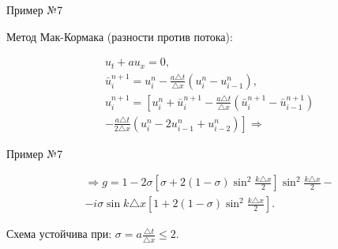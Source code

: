 \documentclass[12pt,xcolor=pst,aspectratio=169]{beamer}
\begin{document}
\begin{frame}{Пример №7}

	\transdissolve[duration=0.1]
	\justifying
	\large

	Метод Мак-Кормака (разности против потока):

	\[
		\begin{split}
			&u_{t} + a u_{x} = 0 , \\
			&\bar{u}^{n + 1}_{i} = u^{n}_{i} - \frac{a \triangle t}{\triangle x} (u^{n}_{i} - u^{n}_{i - 1}) , \\
			&u^{n + 1}_{i} = \left[ u^{n}_{i} + \bar{u}^{n + 1}_{i} - \frac{a \triangle t}{\triangle x} (\bar{u}^{n + 1}_{i} - \bar{u}^{n + 1}_{i - 1}) \right. \\
			& \left. - \frac{a \triangle t}{2 \triangle x} (u^{n}_{i} - 2 u^{n}_{i - 1} + u^{n}_{i - 2}) \right] \Rightarrow
		\end{split}
	\]

\end{frame}

\begin{frame}{Пример №7}

	\transdissolve[duration=0.1]
	\justifying
	\large

	\[
		\begin{split}
			& \Rightarrow g = 1 - 2 \sigma \left[ \sigma + 2 (1 - \sigma) \sin^{2} \frac{k \triangle x}{2} \right] \sin^{2} \frac{k \triangle x}{2} - \\
			& - i \sigma \sin k \triangle x \left[ 1 + 2 (1 - \sigma) \sin^{2} \frac{k \triangle x}{2} \right] .
		\end{split}
	\]

    Схема устойчива при: $\sigma = a \frac{\triangle t}{\triangle x} \leq 2$.\\

\end{frame}
\end{document}
